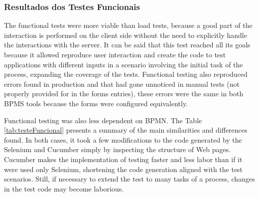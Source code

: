 \documentclass[runningheads,a4paper]{llncs}
\begin{document}
{\subsubsection{Resultados dos Testes Funcionais}
The functional tests were more viable than load tests, because a good part of the interaction is performed on the client side without the need to explicitly handle the interactions with the server. It can be said that this test reached all its goals because it allowed reproduce user interaction and create the code to test applications with different inputs in a scenario involving the initial task of the process, expanding the coverage of the tests. Functional testing also reproduced errors found in production and that had gone unnoticed in manual tests (not properly provided for in the forms entries), these errors were the same in both BPMS tools because the forms were configured equivalently.


Functional testing was also less dependent on BPMN. The Table \ref{tab:testeFuncional} presents a summary of the main similarities and differences found. In both cases, it took a few modifications to the code generated by the Selenium and Cucumber simply by inspecting the structure of Web pages. Cucumber makes the implementation of testing faster and less labor than if it were used only Selenium, shortening the code generation aligned with the test scenarios. Still, if necessary to extend the test to many tasks of a process, changes in the test code may become laborious.

}
\end{document}

